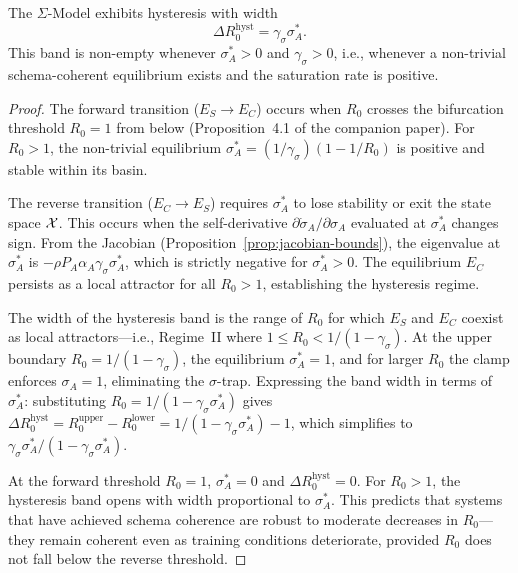 \begin{proposition}
\label{prop:hysteresis}
The $\Sigma$-Model exhibits hysteresis with width
\[
\Delta R_0^{\mathrm{hyst}} = \gamma_\sigma \sigma^*_A.
\]
This band is non-empty whenever $\sigma^*_A > 0$ and $\gamma_\sigma > 0$,
i.e., whenever a non-trivial schema-coherent equilibrium exists and the
saturation rate is positive.
\end{proposition}

\begin{proof}
The forward transition ($E_S \to E_C$) occurs when $R_0$ crosses the
bifurcation threshold $R_0 = 1$ from below (Proposition~4.1 of the
companion paper). For $R_0 > 1$, the non-trivial equilibrium
$\sigma^*_A = (1/\gamma_\sigma)(1 - 1/R_0)$ is positive and stable
within its basin.

The reverse transition ($E_C \to E_S$) requires $\sigma^*_A$ to lose
stability or exit the state space $\mathcal{X}$. This occurs when the self-derivative
$\partial \dot{\sigma}_A / \partial \sigma_A$ evaluated at $\sigma^*_A$
changes sign. From the Jacobian (Proposition~\ref{prop:jacobian-bounds}),
the eigenvalue at $\sigma^*_A$ is $-\rho P_A \alpha_A \gamma_\sigma \sigma^*_A$,
which is strictly negative for $\sigma^*_A > 0$. The equilibrium $E_C$
persists as a local attractor for all $R_0 > 1$, establishing the hysteresis
regime.

The width of the hysteresis band is the range of $R_0$ for which $E_S$
and $E_C$ coexist as local attractors---i.e., Regime~II where
$1 \leq R_0 < 1/(1 - \gamma_\sigma)$. At the upper boundary
$R_0 = 1/(1 - \gamma_\sigma)$, the equilibrium $\sigma^*_A = 1$,
and for larger $R_0$ the clamp enforces $\sigma_A = 1$, eliminating
the $\sigma$-trap. Expressing the band width in terms of $\sigma^*_A$:
substituting $R_0 = 1/(1 - \gamma_\sigma \sigma^*_A)$ gives
$\Delta R_0^{\mathrm{hyst}} = R_0^{\mathrm{upper}} - R_0^{\mathrm{lower}}
= 1/(1 - \gamma_\sigma \sigma^*_A) - 1$, which simplifies to
$\gamma_\sigma \sigma^*_A / (1 - \gamma_\sigma \sigma^*_A)$.

At the forward threshold $R_0 = 1$, $\sigma^*_A = 0$ and
$\Delta R_0^{\mathrm{hyst}} = 0$. For $R_0 > 1$, the hysteresis band
opens with width proportional to $\sigma^*_A$. This predicts that
systems that have achieved schema coherence are robust to moderate
decreases in $R_0$---they remain coherent even as training conditions
deteriorate, provided $R_0$ does not fall below the reverse threshold.
\end{proof}

